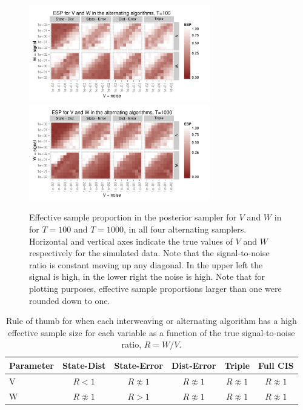 \documentclass{article}
\begin{document}
\begin{figure}[!ht]
\centering
\includegraphics[width=0.7\textwidth]{altESplot1}
\includegraphics[width=0.7\textwidth]{altESplot2}
\caption{Effective sample proportion in the posterior sampler for $V$ and $W$ in for $T=100$ and $T=1000$, in all four alternating samplers. Horizontal and vertical axes indicate the true values of $V$ and $W$ respectively for the simulated data. Note that the signal-to-noise ratio is constant moving up any diagonal. In the upper left the signal is high, in the lower right the noise is high. Note that for plotting purposes, effective sample proportions larger than one were rounded down to one.}
\label{altESplot}
\end{figure}

\begin{table}
  \centering
  \begin{tabular}{|l|ccccc|}\hline
    Parameter & State-Dist        & State-Error       & Dist-Error        & Triple            & Full CIS \\\hline
    V         & $R < 1$           & $R \not\approx 1$ & $R \not\approx 1$ & $R \not\approx 1$ & $R \not\approx 1$ \\
    W         & $R \not\approx 1$ & $R > 1$           & $R \not\approx 1$ & $R \not\approx 1$ & $R \not\approx 1$\\\hline
  \end{tabular}
  \caption{Rule of thumb for when each interweaving or alternating algorithm has a high effective sample size for each variable as a function of the true signal-to-noise ratio, $R=W/V$.}
  \label{tab:stnmix2}
\end{table}
\end{document}
